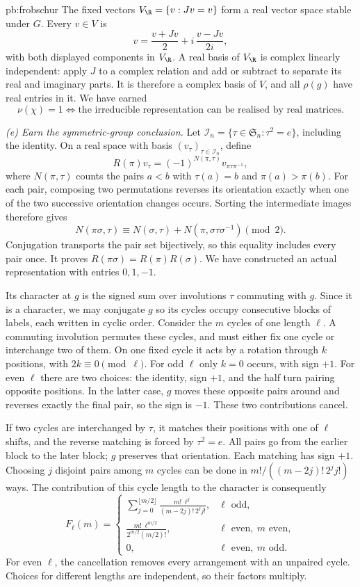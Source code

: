 \begin{solution}{pb:frobschur}
The fixed vectors $V_{\R}=\{v:Jv=v\}$ form a real vector space stable under $G$.
Every $v\in V$ is
\[
v=\frac{v+Jv}{2}
+i\,\frac{v-Jv}{2i},
\]
with both displayed components in $V_{\R}$.
A real basis of $V_{\R}$ is complex linearly independent: apply $J$ to a
complex relation and add or subtract to separate its real and imaginary parts.
It is therefore a complex basis of $V$, and all $\rho(g)$ have real entries in it.
We have earned
\[
\boxed{\nu(\chi)=1
\iff\text{the irreducible representation can be realised by real matrices}.}
\]

\emph{(e) Earn the symmetric-group conclusion.}
Let $\mathcal I_n=\{\tau\in\mathfrak S_n:\tau^2=e\}$, including the identity.
On a real space with basis $(v_\tau)_{\tau\in\mathcal I_n}$, define
\[
R(\pi)v_\tau=(-1)^{N(\pi,\tau)}v_{\pi\tau\pi^{-1}},
\]
where $N(\pi,\tau)$ counts the pairs $a<b$ with $\tau(a)=b$ and
$\pi(a)>\pi(b)$.
For each pair, composing two permutations reverses its orientation exactly
when one of the two successive orientation changes occurs. Sorting the
intermediate images therefore gives
\[
N(\pi\sigma,\tau)\equiv
N(\sigma,\tau)+N(\pi,\sigma\tau\sigma^{-1})\pmod2.
\]
Conjugation transports the pair set bijectively, so this equality includes
every pair once. It proves $R(\pi\sigma)=R(\pi)R(\sigma)$.
We have constructed an actual representation with entries $0,1,-1$.

Its character at $g$ is the signed sum over involutions $\tau$ commuting with $g$.
Since it is a character, we may conjugate $g$ so its cycles occupy consecutive
blocks of labels, each written in cyclic order.
Consider the $m$ cycles of one length $\ell$.
A commuting involution permutes these cycles, and must either fix one cycle
or interchange two of them.
On one fixed cycle it acts by a rotation through $k$ positions,
with $2k\equiv0\pmod\ell$.
For odd $\ell$ only $k=0$ occurs, with sign $+1$.
For even $\ell$ there are two choices: the identity, sign $+1$, and the
half turn pairing opposite positions. In the latter case, $g$ moves these
opposite pairs around and reverses exactly the final pair, so the sign is $-1$.
These two contributions cancel.

If two cycles are interchanged by $\tau$, it matches their positions with
one of $\ell$ shifts, and the reverse matching is forced by $\tau^2=e$.
All pairs go from the earlier block to the later block; $g$ preserves
that orientation. Each matching has sign $+1$.
Choosing $j$ disjoint pairs among $m$ cycles can be done in
$m!/((m-2j)!\,2^j j!)$ ways.
The contribution of this cycle length to the character is consequently
\[
F_\ell(m)=
\begin{cases}
\displaystyle\sum_{j=0}^{\lfloor m/2\rfloor}
\frac{m!\,\ell^j}{(m-2j)!\,2^j j!},
&\ell\text{ odd},\\[6pt]
\displaystyle\frac{m!\,\ell^{m/2}}{2^{m/2}(m/2)!},
&\ell\text{ even},\ m\text{ even},\\[6pt]
0,&\ell\text{ even},\ m\text{ odd}.
\end{cases}
\]
For even $\ell$, the cancellation removes every arrangement with an unpaired
cycle. Choices for different lengths are independent, so their factors multiply.


\end{solution}
